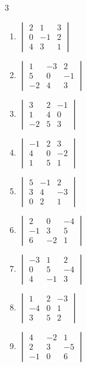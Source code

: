 \begin{multicols}{3}\raggedright
\begin{enumerate}[label=\arabic*.,  leftmargin=*]
\item $\begin{vmatrix} 2 & 1 & 3 \\ 0 & -1 & 2 \\ 4 & 3 & 1 \end{vmatrix}$
\item $\begin{vmatrix} 1 & -3 & 2 \\ 5 & 0 & -1 \\ -2 & 4 & 3 \end{vmatrix}$
\item $\begin{vmatrix} 3 & 2 & -1 \\ 1 & 4 & 0 \\ -2 & 5 & 3 \end{vmatrix}$
\item $\begin{vmatrix} -1 & 2 & 3 \\ 4 & 0 & -2 \\ 1 & 5 & 1 \end{vmatrix}$
\item $\begin{vmatrix} 5 & -1 & 2 \\ 3 & 4 & -3 \\ 0 & 2 & 1 \end{vmatrix}$
\item $\begin{vmatrix} 2 & 0 & -4 \\ -1 & 3 & 5 \\ 6 & -2 & 1 \end{vmatrix}$
\item $\begin{vmatrix} -3 & 1 & 2 \\ 0 & 5 & -4 \\ 4 & -1 & 3 \end{vmatrix}$
\item $\begin{vmatrix} 1 & 2 & -3 \\ -4 & 0 & 1 \\ 3 & 5 & 2 \end{vmatrix}$
\item $\begin{vmatrix} 4 & -2 & 1 \\ 2 & 3 & -5 \\ -1 & 0 & 6 \end{vmatrix}$

\end{enumerate}
\end{multicols}
